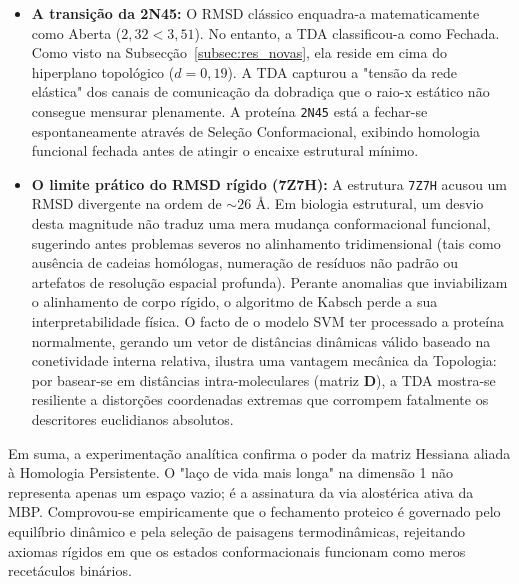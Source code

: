 \documentclass[12pt, a4paper]{article}
\begin{document}
\begin{itemize}
    \item \textbf{A transição da 2N45:} O RMSD clássico enquadra-a matematicamente como Aberta ($2,32 < 3,51$). No entanto, a TDA classificou-a como Fechada. Como visto na Subsecção~\ref{subsec:res_novas}, ela reside em cima do hiperplano topológico ($d = 0,19$). A TDA capturou a "tensão da rede elástica" dos canais de comunicação da dobradiça que o raio-x estático não consegue mensurar plenamente. A proteína \texttt{2N45} está a fechar-se espontaneamente através de Seleção Conformacional, exibindo homologia funcional fechada antes de atingir o encaixe estrutural mínimo.
    \item \textbf{O limite prático do RMSD rígido (7Z7H):} A estrutura \texttt{7Z7H} acusou um RMSD divergente na ordem de $\sim 26$ \AA. Em biologia estrutural, um desvio desta magnitude não traduz uma mera mudança conformacional funcional, sugerindo antes problemas severos no alinhamento tridimensional (tais como ausência de cadeias homólogas, numeração de resíduos não padrão ou artefatos de resolução espacial profunda). Perante anomalias que inviabilizam o alinhamento de corpo rígido, o algoritmo de Kabsch perde a sua interpretabilidade física. O facto de o modelo SVM ter processado a proteína normalmente, gerando um vetor de distâncias dinâmicas válido baseado na conetividade interna relativa, ilustra uma vantagem mecânica da Topologia: por basear-se em distâncias intra-moleculares (matriz $\mathbf{D}$), a TDA mostra-se resiliente a distorções coordenadas extremas que corrompem fatalmente os descritores euclidianos absolutos.
\end{itemize}

Em suma, a experimentação analítica confirma o poder da matriz Hessiana aliada à Homologia Persistente. O "laço de vida mais longa" na dimensão 1 não representa apenas um espaço vazio; é a assinatura da via alostérica ativa da MBP. Comprovou-se empiricamente que o fechamento proteico é governado pelo equilíbrio dinâmico e pela seleção de paisagens termodinâmicas, rejeitando axiomas rígidos em que os estados conformacionais funcionam como meros recetáculos binários.

\newpage
\printbibliography
\end{document}
